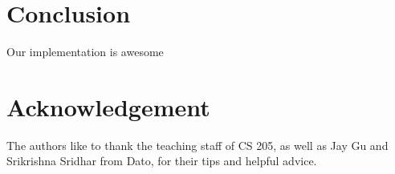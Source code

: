 \section{Conclusion}

Our implementation is awesome

\section*{Acknowledgement}

The authors like to thank the teaching staff of CS 205, as well as Jay Gu and Srikrishna Sridhar from
Dato, for their tips and helpful advice.
